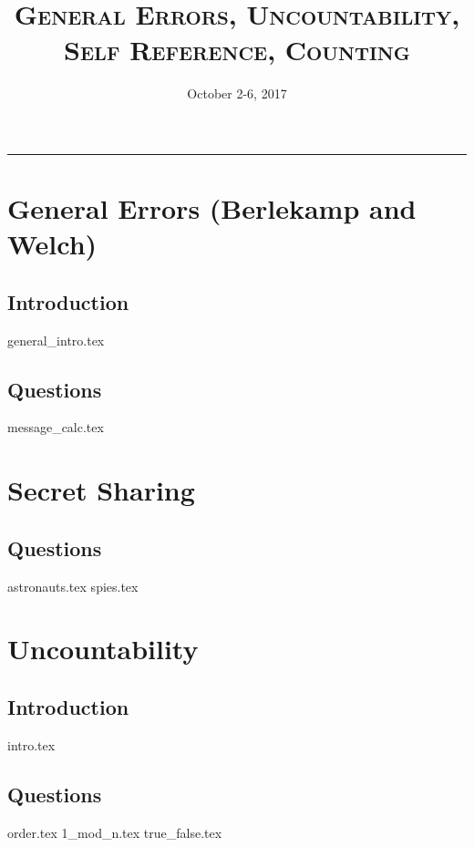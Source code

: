 \documentclass{exam}
\title{\textsc{General Errors, Uncountability, Self Reference, Counting}}
\date{October 2-6, 2017}
\begin{document}
\maketitle
\rule{\textwidth}{0.15em}
\fontsize{12}{15}\selectfont
\thispagestyle{empty}

\section{General Errors (Berlekamp and Welch)}
\subsection{Introduction}
{general_intro.tex}
\subsection{Questions}
\begin{questions}
{message_calc.tex}
\end{questions}

\newpage

\section{Secret Sharing}
\subsection{Questions}
\begin{questions}
{astronauts.tex}
{spies.tex}
\end{questions}

\section{Uncountability}
\subsection{Introduction}
\begin{questions}
{intro.tex}
\end{questions}
\subsection{Questions}
\begin{questions}
{order.tex}
{1_mod_n.tex}
{true_false.tex}
\end{questions}
\end{document}
